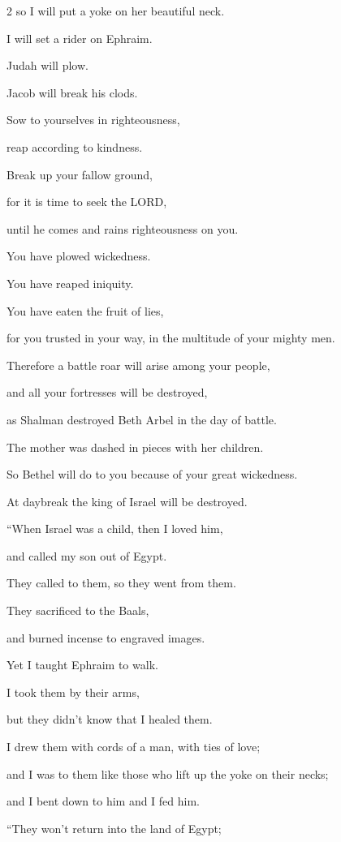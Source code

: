 \begin{multicols}{2}
so I will put a yoke on her beautiful neck.

I will set a rider on Ephraim.

Judah will plow.

Jacob will break his clods.

\myverse{}Sow to yourselves in righteousness,

reap according to kindness.

Break up your fallow ground,

for it is time to seek the LORD,

until he comes and rains righteousness on you.

\myverse{}You have plowed wickedness.

You have reaped iniquity.

You have eaten the fruit of lies,

for you trusted in your way, in the multitude of your mighty men.

\myverse{}Therefore a battle roar will arise among your people,

and all your fortresses will be destroyed,

as Shalman destroyed Beth Arbel in the day of battle.

The mother was dashed in pieces with her children.

\myverse{}So Bethel will do to you because of your great wickedness.

At daybreak the king of Israel will be destroyed.


\mychapter{} \myverse*{}“When Israel was a child, then I loved him,

\quad\quad and called my son out of Egypt.

\myverse{}They called to them, so they went from them.

They sacrificed to the Baals,

and burned incense to engraved images.

\myverse{}Yet I taught Ephraim to walk.

I took them by their arms,

but they didn’t know that I healed them.

\myverse{}I drew them with cords of a man, with ties of love;

and I was to them like those who lift up the yoke on their necks;

and I bent down to him and I fed him.


\vspace{\baselineskip} \myverse{}“They won’t return into the land of Egypt;


\end{multicols}
